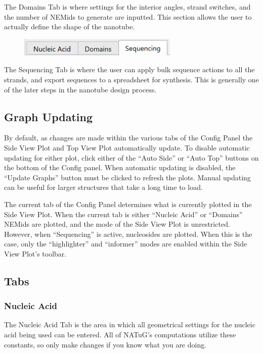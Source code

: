 \documentclass[titlepage]{article}
\begin{document}
	The Domains Tab is where settings for the interior angles, strand switches, and the number of NEMids to generate are inputted. This section allows the user to actually define the shape of the nanotube.

	\begin{figure}[h]
		\centering
		\includegraphics[width=3in]{"sequencing-tab-activated.png"}
		\label{fig:sequencing-activated}
	\end{figure}

	The Sequencing Tab is where the user can apply bulk sequence actions to all the strands, and export sequences to a spreadsheet for synthesis. This is generally one of the later steps in the nanotube design process.
	
	\subsection{Graph Updating}
	By default, as changes are made within the various tabs of the Config Panel the Side View Plot and Top View Plot automatically update. To disable automatic updating for either plot, click either of the “Auto Side” or “Auto Top” buttons on the bottom of the Config panel. When automatic updating is disabled, the “Update Graphs” button must be clicked to refresh the plots. Manual updating can be useful for larger structures that take a long time to load.
	
	The current tab of the Config Panel determines what is currently plotted in the Side View Plot. When the current tab is either “Nucleic Acid” or “Domains” NEMids are plotted, and the mode of the Side View Plot is unrestricted. However, when “Sequencing” is active, nucleosides are plotted. When this is the case, only the “highlighter” and “informer” modes are enabled within the Side View Plot’s toolbar.
	
	\subsection{Tabs}
	
	\subsubsection{Nucleic Acid}
	The Nucleic Acid Tab is the area in which all geometrical settings for the nucleic acid being used can be entered. All of NATuG’s computations utilize these constants, so only make changes if you know what you are doing.
	
\end{document}
